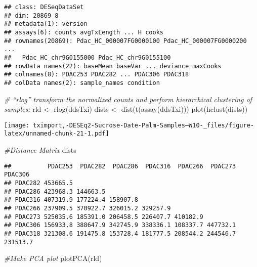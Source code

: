 \documentclass[
]{article}
\newenvironment{Shaded}{\begin{snugshade}}{\end{snugshade}}
\newcommand{\CommentTok}[1]{\textcolor[rgb]{0.56,0.35,0.01}{\textit{#1}}}
\newcommand{\FunctionTok}[1]{\textcolor[rgb]{0.00,0.00,0.00}{#1}}
\newcommand{\NormalTok}[1]{#1}
\newcommand{\OtherTok}[1]{\textcolor[rgb]{0.56,0.35,0.01}{#1}}
\begin{document}
\begin{verbatim}
## class: DESeqDataSet 
## dim: 20869 8 
## metadata(1): version
## assays(6): counts avgTxLength ... H cooks
## rownames(20869): Pdac_HC_000007FG0000100 Pdac_HC_000007FG0000200 ...
##   Pdac_HC_chr9G0155000 Pdac_HC_chr9G0155100
## rowData names(22): baseMean baseVar ... deviance maxCooks
## colnames(8): PDAC253 PDAC282 ... PDAC306 PDAC318
## colData names(2): sample_names condition
\end{verbatim}

\begin{Shaded}
\begin{Highlighting}[]
\CommentTok{\# “rlog” transform the normalized counts and perform hierarchical clustering of samples:}
\NormalTok{rld }\OtherTok{\textless{}{-}} \FunctionTok{rlog}\NormalTok{(ddsTxi)}
\NormalTok{dists }\OtherTok{\textless{}{-}} \FunctionTok{dist}\NormalTok{(}\FunctionTok{t}\NormalTok{(}\FunctionTok{assay}\NormalTok{(ddsTxi)))}
\FunctionTok{plot}\NormalTok{(}\FunctionTok{hclust}\NormalTok{(dists))}
\end{Highlighting}
\end{Shaded}

\texttt{[image: tximport,-DESEq2-Sucrose-Date-Palm-Samples--W10-\_files/figure-latex/unnamed-chunk-21-1.pdf]}

\begin{Shaded}
\begin{Highlighting}[]
\CommentTok{\#Distance Matrix}
\NormalTok{dists}
\end{Highlighting}
\end{Shaded}

\begin{verbatim}
##          PDAC253  PDAC282  PDAC286  PDAC316  PDAC266  PDAC273  PDAC306
## PDAC282 453665.5                                                      
## PDAC286 423968.3 144663.5                                             
## PDAC316 407319.9 177224.4 158907.8                                    
## PDAC266 237909.5 370922.7 326015.2 329257.9                           
## PDAC273 525035.6 185391.0 206458.5 226407.7 410182.9                  
## PDAC306 156933.8 388647.9 342745.9 338336.1 108337.7 447732.1         
## PDAC318 321308.6 191475.8 153728.4 181777.5 208544.2 244546.7 231513.7
\end{verbatim}

\begin{Shaded}
\begin{Highlighting}[]
\CommentTok{\#Make PCA plot}
\FunctionTok{plotPCA}\NormalTok{(rld)}
\end{Highlighting}
\end{Shaded}
\end{document}
